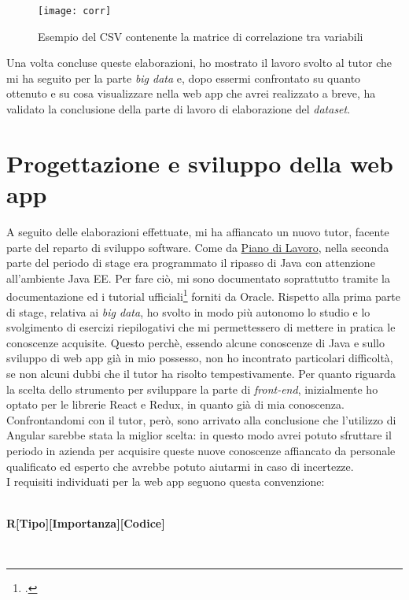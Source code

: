\begin{figure}[!h]
	\centering
	\texttt{[image: corr]}
	\caption{Esempio del CSV contenente la matrice di correlazione tra variabili}
\end{figure}

Una volta concluse queste elaborazioni, ho mostrato il lavoro svolto al tutor che mi ha seguito per la parte \textit{big data} e, dopo essermi confrontato su quanto ottenuto e su cosa visualizzare nella \gls{web app} che avrei realizzato a breve, ha validato la conclusione della parte di lavoro di elaborazione del \textit{dataset}.

\clearpage
\section{Progettazione e sviluppo della web app}
A seguito delle elaborazioni effettuate, mi ha affiancato un nuovo tutor, facente parte del reparto di sviluppo software. Come da \hyperref[pdl]{Piano di Lavoro}, nella seconda parte del periodo di stage era programmato il ripasso di Java con attenzione all'ambiente Java EE. Per fare ciò, mi sono documentato soprattutto tramite la documentazione ed i tutorial ufficiali\footcite{https://docs.oracle.com/javaee/7/tutorial/index.html} forniti da Oracle. Rispetto alla prima parte di stage, relativa ai \textit{big data}, ho svolto in modo più autonomo lo studio e lo svolgimento di esercizi riepilogativi che mi permettessero di mettere in pratica le conoscenze acquisite. Questo perchè, essendo alcune conoscenze di Java e sullo sviluppo di \gls{web app} già in mio possesso, non ho incontrato particolari difficoltà, se non alcuni dubbi che il tutor ha risolto tempestivamente.
Per quanto riguarda la scelta dello strumento per sviluppare la parte di \textit{front-end}, inizialmente ho optato per le librerie React e Redux, in quanto già di mia conoscenza. Confrontandomi con il tutor, però, sono arrivato alla conclusione che l'utilizzo di Angular sarebbe stata la miglior scelta: in questo modo avrei potuto sfruttare il periodo in azienda per acquisire queste nuove conoscenze affiancato da personale qualificato ed esperto che avrebbe potuto aiutarmi in caso di incertezze. \\
I requisiti individuati per la \gls{web app} seguono questa convenzione:\\\\
\centerline{\textbf{R[Tipo][Importanza][Codice]}}\\
